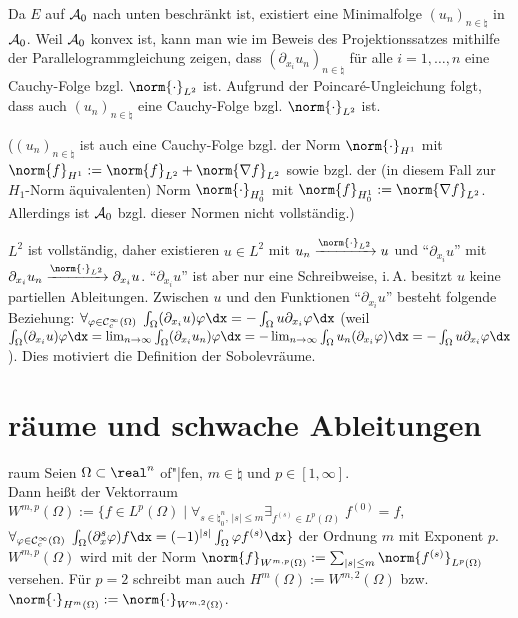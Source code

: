 \begin{Bem}
    Da $E$ auf $\mathcal{A}_0$ nach unten beschränkt ist, existiert eine Minimalfolge
    $(u_n)_{n \in \natural}$ in $\mathcal{A}_0$.
    Weil $\mathcal{A}_0$ konvex ist, kann man wie im Beweis des Projektionssatzes mithilfe der
    Parallelogrammgleichung zeigen, dass $(\partial_{x_i} u_n)_{n \in \natural}$ für alle
    $i = 1, \dotsc, n$ eine Cauchy-Folge bzgl. $\norm{\cdot}_{L^2}$ ist.
    Aufgrund der Poincaré-Ungleichung folgt, dass auch $(u_n)_{n \in \natural}$ eine
    Cauchy-Folge bzgl. $\norm{\cdot}_{L^2}$ ist.

    ($(u_n)_{n \in \natural}$ ist auch eine Cauchy-Folge bzgl. der Norm $\norm{\cdot}_{H^1}$
    mit $\norm{f}_{H^1} := \norm{f}_{L^2} + \norm{\nabla f}_{L^2}$
    sowie bzgl. der (in diesem Fall zur $H_1$-Norm äquivalenten) Norm $\norm{\cdot}_{H^1_0}$
    mit $\norm{f}_{H^1_0} := \norm{\nabla f}_{L^2}$.
    Allerdings ist $\mathcal{A}_0$ bzgl. dieser Normen nicht vollständig.)

    $L^2$ ist vollständig,
    daher existieren $u \in L^2$ mit $u_n \xrightarrow{\norm{\cdot}_{L^2}} u$ und
    "`$\partial_{x_i} u$"' mit $\partial_{x_i} u_n \xrightarrow{\norm{\cdot}_{L^2}}
    \partial_{x_i} u$.
    "`$\partial_{x_i} u$"' ist aber nur eine Schreibweise, i.\,A. besitzt $u$ keine partiellen
    Ableitungen.
    Zwischen $u$ und den Funktionen "`$\partial_{x_i} u$"' besteht folgende Beziehung:
    $\forall_{\varphi \in \C^\infty_c(\Omega)}\;
    \int_\Omega (\partial_{x_i} u) \varphi \dx = -\int_\Omega u \partial_{x_i} \varphi \dx$
    (weil $\int_\Omega (\partial_{x_i} u) \varphi \dx
    = \lim_{n \to \infty} \int_\Omega (\partial_{x_i} u_n) \varphi \dx
    = -\lim_{n \to \infty} \int_\Omega u_n (\partial_{x_i} \varphi) \dx
    = -\int_\Omega u \partial_{x_i} \varphi \dx$).
    Dies motiviert die Definition der Sobolevräume.
\end{Bem}

\section{%
    räume und schwache Ableitungen%
}

\begin{Def}{raum}
    Seien $\Omega \subset \real^n$ of"|fen, $m \in \natural$ und $p \in [1, \infty]$.\\
    Dann heißt der Vektorraum
    $W^{m,p}(\Omega) := \{f \in L^p(\Omega) \;|\; \forall_{s \in \natural_0^n,\, |s| \le m}
    \exists_{f^{(s)} \in L^p(\Omega)}\; f^{(0)} = f,$\\
    $\forall_{\varphi \in \C^\infty_c(\Omega)}\;
    \int_\Omega (\partial_x^s \varphi) f \dx = (-1)^{|s|} \int_\Omega \varphi f^{(s)} \dx\}$
     der Ordnung $m$ mit Exponent $p$.\\
    $W^{m,p}(\Omega)$ wird mit der Norm
    $\norm{f}_{W^{m,p}(\Omega)} := \sum_{|s| \le m} \norm{f^{(s)}}_{L^p(\Omega)}$ versehen.
    Für $p = 2$ schreibt man auch $H^m(\Omega) := W^{m,2}(\Omega)$ bzw.
    $\norm{\cdot}_{H^m(\Omega)} := \norm{\cdot}_{W^{m,2}(\Omega)}$.
\end{Def}

